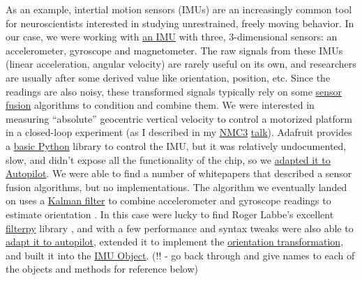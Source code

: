 \documentclass[11pt]{article}
\begin{document}
\begin{multicols}{2}
As an example, intertial motion sensors (IMUs) are an increasingly
common tool for neuroscientists interested in studying unrestrained,
freely moving behavior. In our case, we were working with
\href{https://web.archive.org/web/20210127212527/https://www.sparkfun.com/products/13944}{an
IMU} with three, 3-dimensional sensors: an accelerometer, gyroscope and
magnetometer. The raw signals from these IMUs (linear acceleration,
angular velocity) are rarely useful on its own, and researchers are
usually after some derived value like orientation, position, etc. Since
the readings are also noisy, these transformed signals typically rely on
some \href{https://en.wikipedia.org/wiki/Sensor_fusion}{sensor fusion}
algorithms to condition and combine them. We were interested in
measuring ``absolute'' geocentric vertical velocity to control a
motorized platform in a closed-loop experiment (as I described in my
\href{https://neuromatch.io/abstract/?submission_id=recI5D0QaJ857Y4JI}{NMC3}
\href{https://youtu.be/l2K0l4ec0Xw}{talk}). Adafruit provides a
\href{https://github.com/adafruit/Adafruit_CircuitPython_LSM9DS1/blob/master/adafruit_lsm9ds1.py}{basic
Python} library to control the IMU, but it was relatively undocumented,
slow, and didn't expose all the functionality of the chip, so we
\href{https://web.archive.org/web/20210421223148/https://docs.auto-pi-lot.com/en/parallax/autopilot.hardware.i2c.html\#autopilot.hardware.i2c.I2C_9DOF}{adapted
it to Autopilot}. We were able to find a number of whitepapers that
described a sensor fusion algorithms, but no implementations. The
algorithm we eventually landed on uses a
\href{https://en.wikipedia.org/wiki/Kalman_filter}{Kalman filter} to
combine accelerometer and gyroscope readings to estimate orientation
\cite{abyarjooImplementingSensorFusion2015a} . In this case were
lucky to find Roger Labbe's excellent
\href{https://github.com/rlabbe/filterpy}{filterpy} library \cite{labbeKalmanBayesianFilters2020, labbeRlabbeFilterpy2021} , and with a
few performance and syntax tweaks were also able to
\href{https://web.archive.org/web/20210421223300/https://docs.auto-pi-lot.com/en/parallax/autopilot.transform.timeseries.html\#autopilot.transform.timeseries.Kalman}{adapt
it to autopilot}, extended it to implement the
\href{https://web.archive.org/web/20210421212747/https://docs.auto-pi-lot.com/en/parallax/autopilot.transform.geometry.html}{orientation
transformation}, and built it into the
\href{https://github.com/wehr-lab/autopilot/blob/6843c0e7b6e2bfb4c35e2f7c41972336765feabd/autopilot/hardware/i2c.py\#L469-L501}{IMU
Object}. (!! - go back through and give names to each of the objects and
methods for reference below)


\end{multicols}
\end{document}
